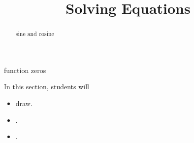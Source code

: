 \documentclass{ximera}
\title{Solving Equations}
\begin{document}
\begin{abstract}
sine and cosine
\end{abstract}
\maketitle




function zeros


























\begin{sectionOutcomes}
In this section, students will 

\begin{itemize}
\item draw.
\item .
\item .
\end{itemize}
\end{sectionOutcomes}
\end{document}
